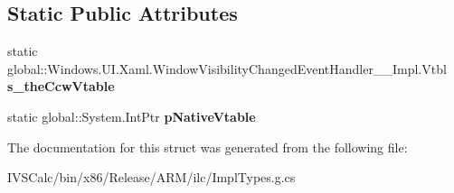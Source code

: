 \subsection*{Static Public Attributes}
\begin{DoxyCompactItemize}
\item 
\mbox{\label{struct_windows_1_1_u_i_1_1_xaml_1_1_window_visibility_changed_event_handler_____impl_1_1_vtbl_a99eb522dc12dd9ba1f7455bec807ac51}} 
static global\+::\+Windows.\+U\+I.\+Xaml.\+Window\+Visibility\+Changed\+Event\+Handler\+\_\+\+\_\+\+Impl.\+Vtbl {\bfseries s\+\_\+the\+Ccw\+Vtable}
\item 
\mbox{\label{struct_windows_1_1_u_i_1_1_xaml_1_1_window_visibility_changed_event_handler_____impl_1_1_vtbl_abfd3c0ce239de47cb2aa71cb79a93ad6}} 
static global\+::\+System.\+Int\+Ptr {\bfseries p\+Native\+Vtable}
\end{DoxyCompactItemize}


The documentation for this struct was generated from the following file\+:\begin{DoxyCompactItemize}
\item 
I\+V\+S\+Calc/bin/x86/\+Release/\+A\+R\+M/ilc/Impl\+Types.\+g.\+cs\end{DoxyCompactItemize}
